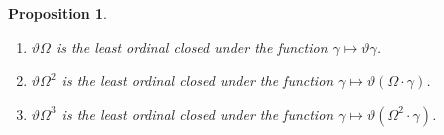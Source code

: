 \documentclass[UKenglish,cleveref,DIV=12]{scrartcl}
\newtheorem{proposition}[lemma]{Proposition}
\theoremstyle{definition}
\theoremstyle{definition}
\begin{document}
\begin{proposition}\label{prop:thetaitems2}\
\begin{enumerate}
 \item $\vartheta\Omega$ is the least ordinal closed under the function $\gamma\mapsto\vartheta\gamma$.
 \item $\vartheta\Omega^2$ is the least ordinal closed under the function $\gamma\mapsto\vartheta(\Omega\cdot\gamma)$.
 \item $\vartheta\Omega^3$ is the least ordinal closed under the function $\gamma\mapsto\vartheta(\Omega^2\cdot\gamma)$.
\end{enumerate}
\end{proposition}
\end{document}
